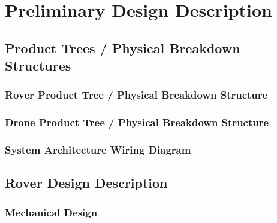 
\section{Preliminary Design Description}
\label{sec:design}

\subsection{Product Trees / Physical Breakdown Structures}
\label{subsec:product_trees_physical_breakdown_structures}

\subsubsection{Rover Product Tree / Physical Breakdown Structure}
\label{subsubsec:rover_product_tree_physical_breakdown_structure}


\subsubsection{Drone Product Tree / Physical Breakdown Structure}
\label{subsubsec:drone_product_tree_physical_breakdown_structure}


\subsubsection{System Architecture Wiring Diagram}
\label{subsubsec:system_architecture_wiring_diagram}



\subsection{Rover Design Description}
\label{subsec:rover_design_description}

\subsubsection{Mechanical Design}
\label{subsubsec:mechanical_design}

